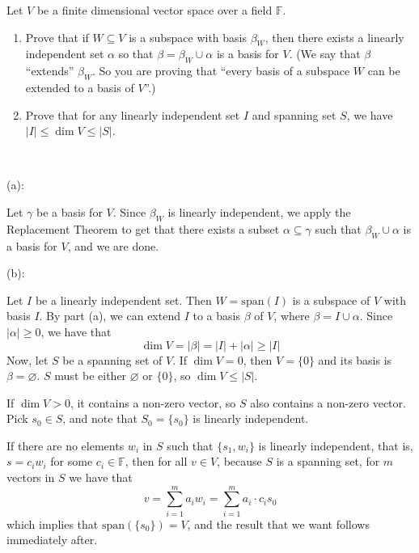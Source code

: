 \documentclass{article}
\theoremstyle{plain} %
\numberwithin{thm}{section} %
\theoremstyle{definition}
\begin{document}
    \newpage
    \begin{question}{5}
        Let \( V \) be a finite dimensional vector space over a field \( \mathbb{F} \).
        
        \begin{enumerate}[label=(\alph*)]
            \item Prove that if \( W \subseteq V \) is a subspace with basis \( \beta_W \), then there exists a linearly independent set \( \alpha \) so that \( \beta = \beta_W \cup \alpha \) is a basis for \( V \). (We say that \( \beta \) “extends” \( \beta_W \). So you are proving that “every basis of a subspace \( W \) can be extended to a basis of \( V \)”.)
            \item Prove that for any linearly independent set \( I \) and spanning set \( S \), we have \( |I| \leq \dim V \leq |S| \).
        \end{enumerate}

        \tcblower
        \ 

        (a):

        Let \(\gamma\) be a basis for \(V\). Since \(\beta _W\) is linearly independent, we apply the Replacement Theorem to get that there exists a subset \(\alpha \subseteq \gamma\) such that \(\beta _W \cup \alpha\) is a basis for \(V\), and we are done.

        \medskip

        (b):

        Let \(I\) be a linearly independent set. Then \(W = \mathrm{span} (I)\) is a subspace of \(V\) with basis \(I\). By part (a), we can extend \(I\) to a basis \(\beta\) of \(V\), where \(\beta = I \cup \alpha\). Since \(|\alpha | \geq 0\), we have that
        \[
            \dim V = |\beta| = |I| + |\alpha| \geq |I|
        \]
        Now, let \(S\) be a spanning set of \(V\). If \(\dim V = 0\), then \(V = \{ 0 \}\) and its basis is \(\beta = \varnothing\). \(S\) must be either \(\varnothing\) or \(\{ 0 \}\), so \(\dim V \leq |S|\).

        If \(\dim V > 0\), it contains a non-zero vector, so \(S\) also contains a non-zero vector. Pick \(s_0 \in S\), and note that \(S_0 = \{ s_0 \}\) is linearly independent.
        
        If there are no elements \(w_i\) in \(S\) such that \(\{ s_1, w_i \}\) is linearly independent, that is, \(s = c_i w_i\) for some \(c_i \in \mathbb{F}\), then for all \(v \in V\), because \(S\) is a spanning set, for \(m\) vectors in \(S\) we have that
        \[
            v = \sum_{i=1}^{m} a_i w_i = \sum_{i=1}^{m} a_i \cdot c_i s_0
        \]
        which implies that \(\mathrm{span} (\{ s_0 \} ) = V\), and the result that we want follows immediately after.


\end{question}
\end{document}

